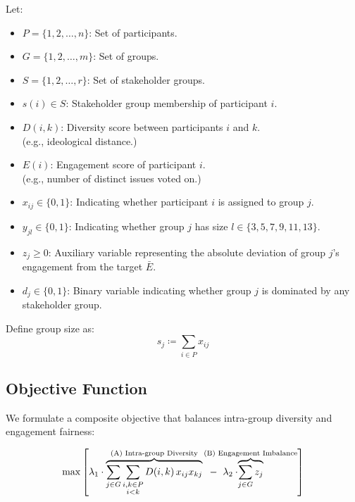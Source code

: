 Let:
\begin{itemize}
    \item $P = \{1, 2, \dots, n\}$: Set of participants.
    \item $G = \{1, 2, \dots, m\}$: Set of groups.
    \item $S = \{1, 2, \dots, r\}$: Set of stakeholder groups.
    \item $s(i) \in S$: Stakeholder group membership of participant $i$.
    \item $D(i,k)$: Diversity score between participants $i$ and $k$.\\(e.g., ideological distance.)
    \item $E(i)$: Engagement score of participant $i$.\\(e.g., number of distinct issues voted on.)
    \item $x_{ij} \in \{0,1\}$: Indicating whether participant $i$ is assigned to group $j$.
    \item $y_{jl} \in \{0,1\}$: Indicating whether group $j$ has size $l \in \{3,5,7,9,11,13\}$.
    \item $z_j \geq 0$: Auxiliary variable representing the absolute deviation of group $j$’s engagement from the target $\bar{E}$.
    \item $d_j \in \{0,1\}$: Binary variable indicating whether group $j$ is dominated by any stakeholder group.
\end{itemize}

Define group size as:
\[
s_j \coloneqq \sum_{i \in P} x_{ij}
\]

\subsection*{Objective Function}

We formulate a composite objective that balances intra-group diversity and engagement fairness:

\[
\max \left[
\lambda_1 \cdot \overbrace{
\sum_{j \in G} \sum_{\substack{i,k \in P \\ i < k}} D(i,k)\,x_{ij} x_{kj}
  }^{\text{(A) Intra-group Diversity}}
\hspace{0.2cm} - \hspace{0.2cm} \lambda_2 \cdot \hspace{-1.3cm} \overbrace{
\sum_{j \in G} z_j
}^{\text{(B) Engagement Imbalance}}
\right]
\]

